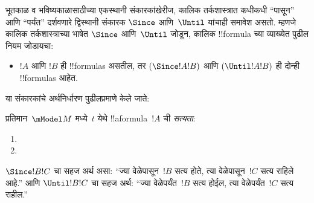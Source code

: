 \documentclass[../../../include/open-logic-section]{subfiles}
\begin{document}


भूतकाळ व भविष्यकाळासाठीच्या एकस्थानी संकारकांखेरीज,
कालिक तर्कशास्त्रात कधीकधी ``पासून'' आणि ``पर्यंत''
दर्शवणारे द्विस्थानी संकारक $\Since $ आणि~$\Until$
यांचाही समावेश असतो. म्हणजे कालिक तर्कशास्त्राच्या
भाषेत $\Since $ आणि~$\Until$ जोडून, कालिक
!!{formula} च्या व्याख्येत पुढील नियम जोडायचा:

\begin{itemize}
\item[] $!A$ आणि $!B$ ही !!{formula}s असतील, तर
  $(\Since  !A !B)$ आणि $(\Until !A !B)$ ही दोन्ही
  !!{formula}s आहेत.
\end{itemize}

या संकारकांचे अर्थनिर्धारण पुढीलप्रमाणे केले जाते:

\begin{defn}
  प्रतिमान~$\mModel M$ मध्ये~$t$ येथे !!a{formula}~$!A$
  ची \emph{सत्यता}:
  \begin{enumerate}
  \item{} 
   \item{} 
  \end{enumerate}
\end{defn}

$\Since  !B !C$ चा सहज अर्थ असा: ``ज्या
वेळेपासून~$!B$ सत्य होते, त्या वेळेपासून~$!C$
सत्य राहिले आहे.'' आणि $\Until !B !C$ चा सहज
अर्थ: ``ज्या वेळेपर्यंत~$!B$ सत्य होईल, त्या
वेळेपर्यंत~$!C$ सत्य राहील.''
\end{document}
